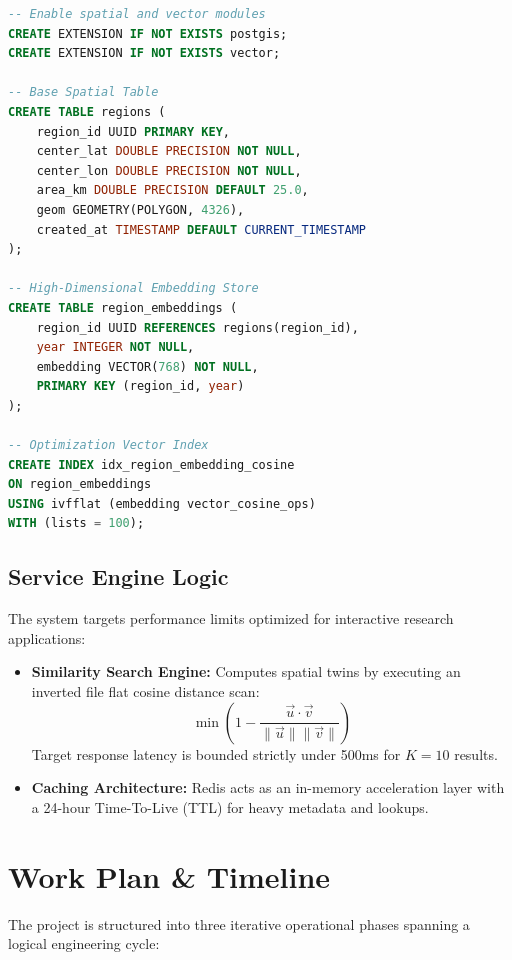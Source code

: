 \documentclass[11pt,a4paper]{article}
\begin{document}
\begin{lstlisting}[language=SQL, caption=Core Database Schema Definition]
-- Enable spatial and vector modules
CREATE EXTENSION IF NOT EXISTS postgis;
CREATE EXTENSION IF NOT EXISTS vector;

-- Base Spatial Table
CREATE TABLE regions (
    region_id UUID PRIMARY KEY,
    center_lat DOUBLE PRECISION NOT NULL,
    center_lon DOUBLE PRECISION NOT NULL,
    area_km DOUBLE PRECISION DEFAULT 25.0,
    geom GEOMETRY(POLYGON, 4326),
    created_at TIMESTAMP DEFAULT CURRENT_TIMESTAMP
);

-- High-Dimensional Embedding Store
CREATE TABLE region_embeddings (
    region_id UUID REFERENCES regions(region_id),
    year INTEGER NOT NULL,
    embedding VECTOR(768) NOT NULL,
    PRIMARY KEY (region_id, year)
);

-- Optimization Vector Index
CREATE INDEX idx_region_embedding_cosine 
ON region_embeddings 
USING ivfflat (embedding vector_cosine_ops) 
WITH (lists = 100);
\end{lstlisting}

\subsection{Service Engine Logic}
The system targets performance limits optimized for interactive research applications:
\begin{itemize}
    \item \textbf{Similarity Search Engine:} Computes spatial twins by executing an inverted file flat cosine distance scan:
    $$\min \left( 1 - \frac{\vec{u} \cdot \vec{v}}{\|\vec{u}\| \|\vec{v}\|} \right)$$
    Target response latency is bounded strictly under 500ms for $K=10$ results.
    \item \textbf{Caching Architecture:} Redis acts as an in-memory acceleration layer with a 24-hour Time-To-Live (TTL) for heavy metadata and lookups.
\end{itemize}

\section{Work Plan \& Timeline}
The project is structured into three iterative operational phases spanning a logical engineering cycle:
\end{document}
